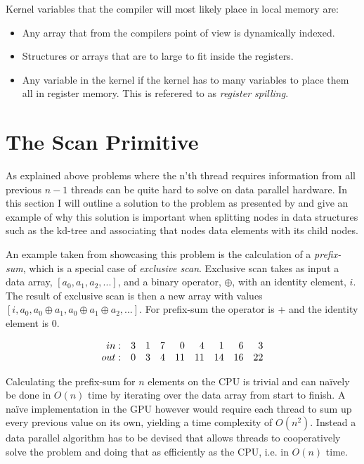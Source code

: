 Kernel variables that the compiler will most likely place in local
memory are:

\begin{itemize}
  \item Any array that from the compilers point of view is dynamically
    indexed.
  \item Structures or arrays that are to large to fit inside the
    registers.
  \item Any variable in the kernel if the kernel has to many variables
    to place them all in register memory. This is referered to as
    \textit{register spilling}.
\end{itemize}



\section{The Scan Primitive}\label{sec:GPUprims}


As explained above problems where the n’th thread requires information
from all previous $n-1$ threads can be quite hard to solve on data
parallel hardware. In this section I will outline a solution to the
problem as presented by \sengupta{} and give an example of why this
solution is important when splitting nodes in data structures such as
the kd-tree and associating that nodes data elements with its child
nodes.


An example taken from \sengupta{} showcasing this problem is the
calculation of a \textit{prefix-sum}, which is a special case of
\textit{exclusive scan}. Exclusive scan takes as input a data array,
$[a_0, a_1, a_2, ...]$, and a binary operator, $\oplus$, with an
identity element, $i$. The result of exclusive scan is then a new
array with values $[i, a_0, a_0 \oplus a_1, a_0 \oplus a_1 \oplus a_2,
  ...]$. For prefix-sum the operator is + and the identity element is
0.

\begin{displaymath}
  \begin{array}{r r r r r r r r r}
    in: & 3 & 1 & 7 & 0 & 4 & 1 & 6 & 3 \\
    out: & 0 & 3 & 4 & 11 & 11 & 14 & 16 & 22 \\
  \end{array}
\end{displaymath}

Calculating the prefix-sum for $n$ elements on the CPU is trivial and
can naïvely be done in $O(n)$ time by iterating over the data array
from start to finish. A naïve implementation in the GPU however would
require each thread to sum up every previous value on its own,
yielding a time complexity of $O(n^2)$. Instead a data parallel
algorithm has to be devised that allows threads to cooperatively solve
the problem and doing that as efficiently as the CPU, i.e. in $O(n)$
time.


